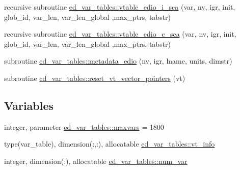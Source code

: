 \begin{DoxyCompactItemize}
\item 
recursive subroutine \hyperlink{namespaceed__var__tables_a9729653cf659295bb68d54f3979f7615}{ed\+\_\+var\+\_\+tables\+::vtable\+\_\+edio\+\_\+i\+\_\+sca} (var, nv, igr, init, glob\+\_\+id, var\+\_\+len, var\+\_\+len\+\_\+global                                                                                                                                                                       ,max\+\_\+ptrs, tabstr)
\item 
recursive subroutine \hyperlink{namespaceed__var__tables_a9bcc45986b101b7495287ad999e5d52e}{ed\+\_\+var\+\_\+tables\+::vtable\+\_\+edio\+\_\+c\+\_\+sca} (var, nv, igr, init, glob\+\_\+id, var\+\_\+len, var\+\_\+len\+\_\+global                                                                                                                                                                       ,max\+\_\+ptrs, tabstr)
\item 
subroutine \hyperlink{namespaceed__var__tables_a163fc43f01ed02a236a290d4b1d9575b}{ed\+\_\+var\+\_\+tables\+::metadata\+\_\+edio} (nv, igr, lname, units, dimstr)
\item 
subroutine \hyperlink{namespaceed__var__tables_aed76c1293872b5f6cf4c39c0747d2bb4}{ed\+\_\+var\+\_\+tables\+::reset\+\_\+vt\+\_\+vector\+\_\+pointers} (vt)
\end{DoxyCompactItemize}
\subsection*{Variables}
\begin{DoxyCompactItemize}
\item 
integer, parameter \hyperlink{namespaceed__var__tables_a932cd6738531dd3348d40636bd8a20ae}{ed\+\_\+var\+\_\+tables\+::maxvars} = 1800
\item 
type(var\+\_\+table), dimension(\+:,\+:), allocatable \hyperlink{namespaceed__var__tables_a949fa9110a835bd59e16bd0a5e153498}{ed\+\_\+var\+\_\+tables\+::vt\+\_\+info}
\item 
integer, dimension(\+:), allocatable \hyperlink{namespaceed__var__tables_ae879757190201e461d3bc09131321a64}{ed\+\_\+var\+\_\+tables\+::num\+\_\+var}
\end{DoxyCompactItemize}
